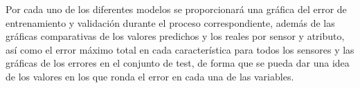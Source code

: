 Por cada uno de los diferentes modelos se proporcionará una gráfica del error de entrenamiento y validación
durante el proceso correspondiente, además de las gráficas comparativas de los valores predichos y 
los reales por sensor y atributo, así como el error máximo total en cada característica para todos los sensores y las gráficas
de los errores en el conjunto de test, de forma que se 
pueda dar una idea de los valores en los que ronda el error en cada una de las variables. 

